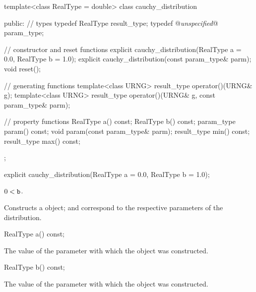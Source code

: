 \begin{codeblock}
template<class RealType = double>
 class cauchy_distribution
{
public:
 // types
 typedef RealType result_type;
 typedef @\textit{unspecified}@ param_type;

 // constructor and reset functions
 explicit cauchy_distribution(RealType a = 0.0, RealType b = 1.0);
 explicit cauchy_distribution(const param_type& parm);
 void reset();

 // generating functions
 template<class URNG>
   result_type operator()(URNG& g);
 template<class URNG>
   result_type operator()(URNG& g, const param_type& parm);

 // property functions
 RealType a() const;
 RealType b() const;
 param_type param() const;
 void param(const param_type& parm);
 result_type min() const;
 result_type max() const;
};
\end{codeblock}


%
\begin{itemdecl}
explicit cauchy_distribution(RealType a = 0.0, RealType b = 1.0);
\end{itemdecl}

\begin{itemdescr}
\pnum\requires
 $ 0 < \texttt{b} $.

\pnum\effects Constructs a  object;
  and 
 correspond to the respective parameters of the distribution.
\end{itemdescr}

%
%
\begin{itemdecl}
RealType a() const;
\end{itemdecl}

\begin{itemdescr}
\pnum\returns The value of the  parameter
 with which the object was constructed.
\end{itemdescr}

%
%
\begin{itemdecl}
RealType b() const;
\end{itemdecl}

\begin{itemdescr}
\pnum\returns The value of the  parameter
 with which the object was constructed.
\end{itemdescr}

